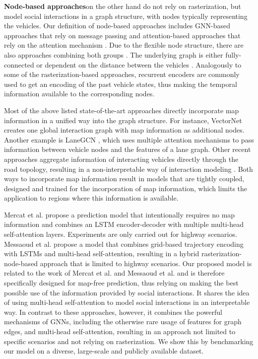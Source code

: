 \documentclass[letterpaper, 10 pt, conference]{ieeeconf}
\begin{document}
\textbf{Node-based approaches}\quad on the other hand do not rely on rasterization, but model social interactions in a graph structure, with nodes typically representing the vehicles.
Our definition of node-based approaches includes GNN-based approaches \cite{Li2020a_ARXIV,Casas2020, Salzmann2020} that rely on message passing \cite{Gilmer2017} and attention-based approaches \cite{Liang2020, Tang2019, Messaoud2021, Mercat2020, Gao2020} that rely on the attention mechanism \cite{Vaswani2017}.
Due to the flexible node structure, there are also approaches combining both groups \cite{Khandelwal2020_ARXIV, Ma2019, Li2020b}.
The underlying graph is either fully-connected \cite{Liang2020, Casas2020, Messaoud2021, Mercat2020, Gao2020, Khandelwal2020_ARXIV} or dependent on the distance between the vehicles \cite{Li2020a_ARXIV, Salzmann2020, Tang2019, Ma2019, Li2020b}.
Analogously to some of the rasterization-based approaches, recurrent encoders are commonly used to get an encoding of the past vehicle states, thus making the temporal information available to the corresponding nodes.

Most of the above listed state-of-the-art approaches directly incorporate map information in a unified way into the graph structure.
For instance, VectorNet \cite{Gao2020} creates one global interaction graph with map information as additional nodes.
Another example is LaneGCN \cite{Liang2020}, which uses multiple attention mechanisms to pass information between vehicle nodes and the features of a lane graph.
Other recent approaches aggregate information of interacting vehicles directly through the road topology, resulting in a non-interpretable way of interaction modeling \cite{Kim2021_ARXIV, Zeng2021_ARXIV}.
Both ways to incorporate map information result in models that are tightly coupled, designed and trained for the incorporation of map information, which limits the application to regions where this information is available.

Mercat et al. \cite{Mercat2020} propose a prediction model that intentionally requires no map information and combines an LSTM encoder-decoder with multiple multi-head self-attention layers.
Experiments are only carried out for highway scenarios.
Messaoud et al. \cite{Messaoud2021} propose a model that combines grid-based trajectory encoding with LSTMs and multi-head self-attention, resulting in a hybrid rasterization-node-based approach that is limited to highway scenarios.
Our proposed model is related to the work of Mercat et al. \cite{Mercat2020} and Messaoud et al. \cite{Messaoud2021} and is therefore specifically designed for map-free prediction, thus relying on making the best possible use of the information provided by social interactions.
It shares the idea of using multi-head self-attention to model social interactions in an interpretable way.
In contrast to these approaches, however, it combines the powerful mechanisms of GNNs, including the otherwise rare usage of features for graph edges, and multi-head self-attention, resulting in an approach not limited to specific scenarios and not relying on rasterization.
We show this by benchmarking our model on a diverse, large-scale and publicly available dataset.
\end{document}
